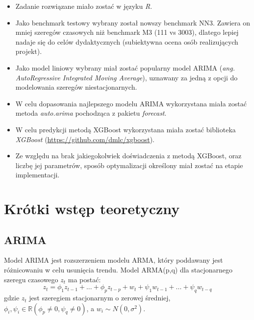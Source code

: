 \documentclass[11pt]{report}
\begin{document}
\begin{itemize}
\item Zadanie rozwiązane miało zostać w języku \textit{R}.

\item Jako benchmark testowy wybrany został nowszy benchmark NN3.
Zawiera on mniej szeregów czasowych niż benchmark M3 (111 vs 3003), dlatego lepiej nadaje się do celów dydaktycznych (subiektywna ocena osób realizujących projekt).

\item Jako model liniowy wybrany miał zostać popularny model ARIMA (\textit{ang. AutoRegressive Integrated Moving Average}), uznawany za jedną z opcji do modelowania szeregów niestacjonarnych.

\item W celu dopasowania najlepszego modelu ARIMA wykorzystana miała zostać metoda \textit{auto.arima} pochodząca z pakietu \textit{forecast}.

\item W celu predykcji metodą XGBoost wykorzystana miała zostać biblioteka \textit{XGBoost} (\url{https://github.com/dmlc/xgboost}).

\item Ze względu na brak jakiegokolwiek doświadczenia z metodą XGBoost, oraz liczbę jej parametrów, sposób optymalizacji określony miał zostać na etapie implementacji.
\end{itemize}

\section{Krótki wstęp teoretyczny}

\subsection{ARIMA}
Model ARIMA jest rozszerzeniem modelu ARMA, który poddawany jest różnicowaniu w celu usunięcia trendu.
Model ARMA(p,q) dla stacjonarnego szeregu czasowego $z_t$ ma postać:
\begin{equation}
    z_t = \phi_1 z_{t-1} + ... + \phi_p z_{t-p} + w_t + \psi_1 w_{t-1} + ... + \psi_q w_{t-q}
\end{equation}
gdzie $z_t$ jest szeregiem stacjonarnym o zerowej średniej, $\phi_i,\psi_i \in \mathbb{R} (\phi_p \neq 0, \psi_q \neq 0)$, a $w_i \sim N(0, \sigma^2)$.
\end{document}
